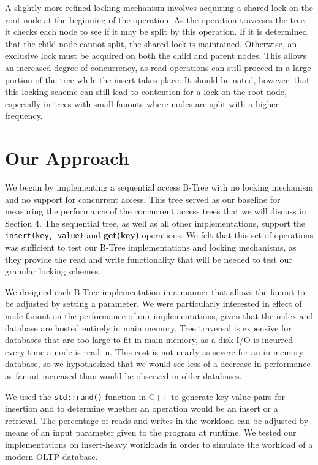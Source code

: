 \documentclass{sig-alternate}
\begin{document}
A slightly more refined locking mechanism involves acquiring a shared lock on the root node at the beginning of the operation. As the operation traverses the tree, it checks each node to see if it may be split by this operation. If it is determined that the child node cannot split, the shared lock is maintained. Otherwise, an exclusive lock must be acquired on both the child and parent nodes. This allows an increased degree of concurrency, as read operations can still proceed in a large portion of the tree while the insert takes place.  It should be noted, however, that this locking scheme can still lead to contention for a lock on the root node, especially in trees with small fanouts where nodes are split with a higher frequency.

\section{Our Approach}
We began by implementing a sequential access B-Tree with no locking mechanism and no support for concurrent access. This tree served as our baseline for measuring the performance of the concurrent access trees that we will discuss in Section 4. The sequential tree, as well as all other implementations, support the \texttt{insert(key, value)} and \textbf{get(key)} operations. We felt that this set of operations was sufficient to test our B-Tree implementations and locking mechanisms, as they provide the read and write functionality that will be needed to test our granular locking schemes.

We designed each B-Tree implementation in a manner that allows the fanout to be adjusted by setting a parameter. We were particularly interested in effect of node fanout on the performance of our implementations, given that the index and database are hosted entirely in main memory. Tree traversal is expensive for databases that are too large to fit in main memory, as a disk I/O is incurred every time a node is read in. This cost is not nearly as severe for an in-memory database, so we hypothesized that we would see less of a decrease in performance as fanout increased than would be observed in older databases.

We used the \texttt{std::rand()} function in C++ to generate key-value pairs for insertion and to determine whether an operation would be an insert or a retrieval. The percentage of reads and writes in the workload can be adjusted by means of an input parameter given to the program at runtime. We tested our implementations on insert-heavy workloads in order to simulate the workload of a modern OLTP database.
\end{document}
